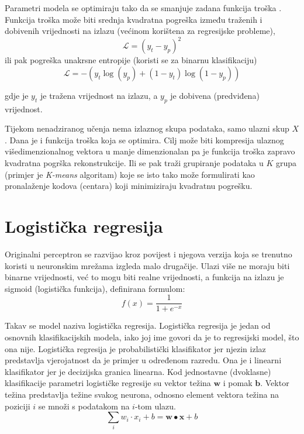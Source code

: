 \documentclass[times, utf8, diplomski, numeric]{fer}
\begin{document}
Parametri modela se optimiraju tako da se smanjuje zadana funkcija troška . Funkcija troška može biti srednja kvadratna pogreška između traženih i dobivenih vrijednosti na izlazu (većinom korištena za regresijske probleme),
\begin{equation}
	\mathcal{L} = (y_t - y_p)^2
\end{equation}
ili pak pogreška unakrsne entropije (koristi se za binarnu klasifikaciju)
\begin{equation}
	\mathcal{L} = -(y_t \log(y_p) + (1 - y_t) \log(1 - y_p))
\end{equation}

gdje je $y_t$ je tražena vrijednost na izlazu, a $y_p$ je dobivena (predviđena) vrijednost.

Tijekom nenadziranog učenja nema izlaznog skupa podataka, samo ulazni skup $X$. Dana je i funkcija troška koja se optimira.
Cilj može biti kompresija ulaznog višedimenzionalnog vektora u manje dimenzionalan pa je funkcija troška zapravo kvadratna pogrška rekonstrukcije. Ili se pak traži grupiranje podataka u $K$ grupa (primjer je \textit{K-means} algoritam\cite{Hartigan-1979}) koje se isto tako može formulirati kao pronalaženje kodova (centara) koji minimiziraju kvadratnu pogrešku.


\section{Logistička regresija}
\label{chap:logisticka_regresija}

Originalni perceptron se razvijao kroz povijest i njegova verzija koja se trenutno koristi u neuronskim mrežama izgleda malo drugačije. Ulazi više ne moraju biti binarne vrijednosti, već to mogu biti realne vrijednosti, a funkcija na izlazu je sigmoid (logistička funkcija), definirana formulom:
\begin{equation}
f(x) = \frac{1}{1+e^{-x}}
\end{equation}

Takav se model naziva logistička regresija. Logistička regresija je jedan od osnovnih klasifikacijskih modela, iako joj ime govori da je to regresijski model, što ona nije.
Logistička regresija je probabilistički klasifikator jer njezin izlaz predstavlja vjerojatnost da je primjer u određenom razredu.\cite{strojno_snajder}
Ona je i linearni klasifikator jer je decizijska granica linearna.
Kod jednostavne (dvoklasne) klasifikacije parametri logističke regresije su vektor težina $\boldsymbol{w}$ i pomak $\boldsymbol{b}$. Vektor težina predstavlja težine svakog neurona, odnosno element vektora težina na poziciji $i$ se množi s podatakom na $i$-tom ulazu.
\begin{equation}
  \sum_i w_i \cdot x_i + b = \boldsymbol{w} \bullet \boldsymbol{x} + b
\end{equation}
\end{document}
